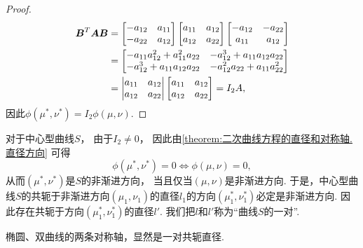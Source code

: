 \begin{proposition}
\begin{proof}
\begin{align*}
	\boldsymbol{B}^T
	\boldsymbol{A}
	\boldsymbol{B}
	&= \begin{bmatrix}
		-a_{12} & a_{11} \\
		-a_{22} & a_{12}
	\end{bmatrix}
	\begin{bmatrix}
		a_{11} & a_{12} \\
		a_{12} & a_{22}
	\end{bmatrix}
	\begin{bmatrix}
		-a_{12} & -a_{22} \\
		a_{11} & a_{12}
	\end{bmatrix} \\
	&= \begin{bmatrix}
		- a_{11} a_{12}^2 + a_{11}^2 a_{22}
		& -a_{12}^3 + a_{11} a_{12} a_{22} \\
		-a_{12}^3 + a_{11} a_{12} a_{22}
		& -a_{12}^2 a_{22} + a_{11} a_{22}^2
	\end{bmatrix} \\
	&= \begin{vmatrix}
		a_{11} & a_{12} \\
		a_{12} & a_{22}
	\end{vmatrix}
	\begin{bmatrix}
		a_{11} & a_{12} \\
		a_{12} & a_{22}
	\end{bmatrix}
	= I_2 A,
\end{align*}
因此\(\phi(\mu^*,\nu^*) = I_2 \phi(\mu,\nu)\).
\end{proof}
\end{proposition}

对于中心型曲线\(S\)，
由于\(I_2 \neq 0\)，
因此由\cref{theorem:二次曲线方程的直径和对称轴.直径方向} 可得\begin{equation*}
	\phi(\mu^*,\nu^*) = 0
	\iff
	\phi(\mu,\nu) = 0,
\end{equation*}
从而\((\mu^*,\nu^*)\)是\(S\)的非渐进方向，
当且仅当\((\mu,\nu)\)是非渐进方向.
于是，中心型曲线\(S\)的共轭于非渐进方向\((\mu_1,\nu_1)\)的直径\(l_1\)的方向\((\mu^*_1,\nu^*_1)\)必定是非渐进方向.
因此存在共轭于方向\((\mu^*_1,\nu^*_1)\)的直径\(l'\).
我们把\(l\)和\(l'\)称为“曲线\(S\)的一对”.

椭圆、双曲线的两条对称轴，显然是一对共轭直径.

